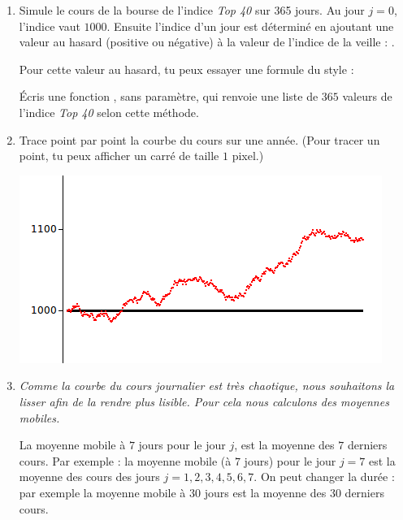 \documentclass[11pt,class=report,crop=false]{standalone}
\begin{document}
\begin{activite}



\begin{enumerate}
  \item Simule le cours de la bourse de l'indice \emph{Top 40} sur 365 jours.
  Au jour $j=0$, l'indice vaut $1000$. Ensuite l'indice d'un jour est déterminé en ajoutant une valeur au hasard (positive ou négative) à la valeur de l'indice de la veille :  
  .
  
  Pour cette valeur au hasard, tu peux essayer une formule du style :  
  
  Écris une fonction , sans paramètre, qui renvoie une liste de $365$ valeurs de l'indice \emph{Top 40} selon cette méthode.
  
  \item Trace point par point la courbe du cours sur une année. (Pour tracer un point, tu peux afficher un carré de taille $1$ pixel.)
  
\begin{center}
\includegraphics[scale=\myscale,scale=0.7]{ecran-stat-5a}
\end{center}

   \item \emph{Comme la courbe du cours journalier est très chaotique, nous souhaitons la lisser afin de la rendre plus lisible. Pour cela nous calculons des moyennes mobiles.}
   
   La moyenne mobile à $7$ jours pour le jour $j$, est la moyenne des $7$ derniers cours. Par exemple : la moyenne mobile (à $7$ jours) pour le jour $j = 7$ est la moyenne des cours des jours $j=1,2,3,4,5,6,7$. On peut changer la durée : par exemple la moyenne mobile à $30$ jours est la moyenne des $30$ derniers cours.
   

\end{enumerate}
\end{activite}
\end{document}
